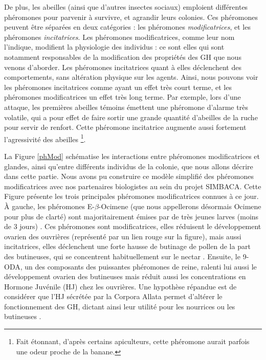 			De plus, les abeilles (ainsi que d'autres insectes sociaux) emploient différentes phéromones pour parvenir à survivre, et agrandir leurs colonies. Ces phéromones peuvent être séparées en deux catégories : les phéromones \textit{modificatrices}, et les phéromones \textit{incitatrices}. Les phéromones modificatrices, comme leur nom l'indique, modifient la physiologie des individus : ce sont elles qui sont notamment responsables de la modification des propriétés des GH que nous venons d'aborder. Les phéromones incitatrices quant à elles déclenchent des comportements, sans altération physique sur les agents. Ainsi, nous pouvons voir les phéromones incitatrices comme ayant un effet très court terme, et les phéromones modificatrices un effet très long terme. Par exemple, lors d'une attaque, les premières abeilles témoins émettent une phéromone d'alarme très volatile, qui a pour effet de faire sortir une grande quantité d'abeilles de la ruche pour servir de renfort. Cette phéromone incitatrice augmente aussi fortement l'agressivité des abeilles \footnote{Fait étonnant, d'après certains apiculteurs, cette phéromone aurait parfois une odeur proche de la banane.}.
			
			La Figure \ref{phMod} schématise les interactions entre phéromones modificatrices et glandes, ainsi qu'entre différents individus de la colonie, que nous allons décrire dans cette partie. Nous avons pu construire ce modèle simplifié des phéromones modificatrices avec nos partenaires biologistes au sein du projet SIMBACA. Cette Figure présente les trois principales phéromones modificatrices connues à ce jour. À gauche, les phéromones E-$\beta$-Ocimene (que nous appellerons désormais Ocimene pour plus de clarté) sont majoritairement émises par de très jeunes larves (moins de 3 jours) \cite{maisonnasse_e-b-ocimene_2010}. Ces phéromones sont modificatrices, elles réduisent le développement ovarien des ouvrières (représenté par un lien rouge sur la figure), mais aussi incitatrices, elles déclenchent une forte hausse de butinage de pollen de la part des butineuses, qui se concentrent habituellement sur le nectar \cite{maisonnasse_e-b-ocimene_2010}. Ensuite, le 9-ODA, un des composants des puissantes phéromones de reine, ralenti lui aussi le développement ovarien des butineuses mais réduit aussi les concentrations en Hormone Juvénile (HJ) chez les ouvrières. Une hypothèse répandue est de considérer que l'HJ sécrétée par la Corpora Allata permet d'altérer le fonctionnement des GH, dictant ainsi leur utilité pour les nourrices ou les butineuses \cite{robinson_colony_1998}.
			 
